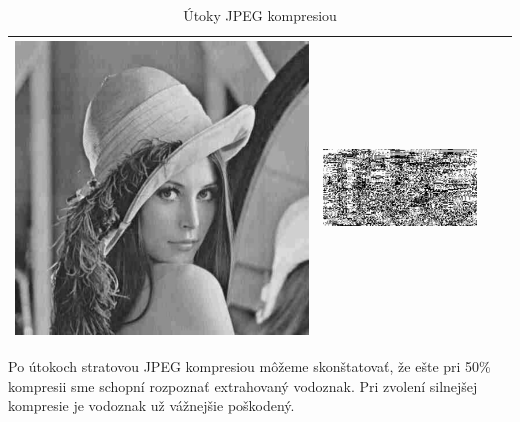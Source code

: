 \begin{table}[h]
\begin{tabular}{llcc}
\begin{minipage}[c]{.1\textwidth}
  \includegraphics[scale=0.1]{obrazky/jpeg20}
\end{minipage} &
 \begin{minipage}[c]{.15\textwidth}
   \includegraphics[scale=0.25]{obrazky/jpeg20-wm}
 \end{minipage}  \\ \hline
\end{tabular}
\caption{Útoky JPEG kompresiou}
\end{table}

Po útokoch stratovou JPEG kompresiou môžeme skonštatovať, že ešte pri 50\% kompresii sme schopní rozpoznať extrahovaný vodoznak. Pri zvolení silnejšej kompresie je vodoznak už vážnejšie poškodený.

